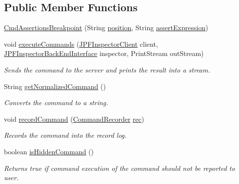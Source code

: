 \subsection*{Public Member Functions}
\begin{DoxyCompactItemize}
\item 
\hyperlink{classgov_1_1nasa_1_1jpf_1_1inspector_1_1client_1_1commands_1_1_cmd_assertions_breakpoint_a93fd5361f069ac6d0121b99af3d672e2}{Cmd\+Assertions\+Breakpoint} (String \hyperlink{classgov_1_1nasa_1_1jpf_1_1inspector_1_1client_1_1commands_1_1_cmd_assertions_breakpoint_a058ca4f053ad9225b170a5004e970f6d}{position}, String \hyperlink{classgov_1_1nasa_1_1jpf_1_1inspector_1_1client_1_1commands_1_1_cmd_assertions_breakpoint_a895cf2fd0928238c1a8d0e6349b40b91}{assert\+Expression})
\item 
void \hyperlink{classgov_1_1nasa_1_1jpf_1_1inspector_1_1client_1_1commands_1_1_cmd_assertions_breakpoint_ac8b520fff76bfc82cd947184348aa36f}{execute\+Commands} (\hyperlink{classgov_1_1nasa_1_1jpf_1_1inspector_1_1client_1_1_j_p_f_inspector_client}{J\+P\+F\+Inspector\+Client} client, \hyperlink{interfacegov_1_1nasa_1_1jpf_1_1inspector_1_1interfaces_1_1_j_p_f_inspector_back_end_interface}{J\+P\+F\+Inspector\+Back\+End\+Interface} inspector, Print\+Stream out\+Stream)
\begin{DoxyCompactList}\small\item\em Sends the command to the server and prints the result into a stream. \end{DoxyCompactList}\item 
String \hyperlink{classgov_1_1nasa_1_1jpf_1_1inspector_1_1client_1_1commands_1_1_cmd_assertions_breakpoint_a2a34e0ea4a29e9075d43e4dbbfc2d083}{get\+Normalized\+Command} ()
\begin{DoxyCompactList}\small\item\em Converts the command to a string. \end{DoxyCompactList}\item 
void \hyperlink{classgov_1_1nasa_1_1jpf_1_1inspector_1_1client_1_1_client_command_ae0670332ec750bc5b9016d0b04d8adfe}{record\+Command} (\hyperlink{classgov_1_1nasa_1_1jpf_1_1inspector_1_1client_1_1_command_recorder}{Command\+Recorder} \hyperlink{classgov_1_1nasa_1_1jpf_1_1inspector_1_1client_1_1_client_command_af4246f2427035c72a6af45a2c61361f7}{rec})
\begin{DoxyCompactList}\small\item\em Records the command into the record log. \end{DoxyCompactList}\item 
boolean \hyperlink{classgov_1_1nasa_1_1jpf_1_1inspector_1_1client_1_1_client_command_afb09c400c64e2d8e01059b91ff847761}{is\+Hidden\+Command} ()
\begin{DoxyCompactList}\small\item\em Returns true if command execution of the command should not be reported to user. \end{DoxyCompactList}\end{DoxyCompactItemize}
